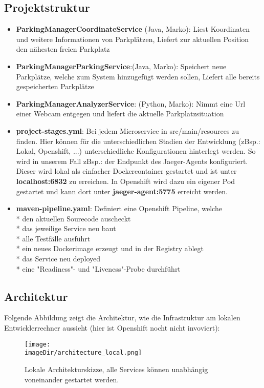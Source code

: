 \documentclass[11pt, a4paper, twoside]{article}   	%
\newcommand{\imageDir}{../../images}
\begin{document}
\subsection{Projektstruktur}
\begin{itemize}
	\item \textbf{ParkingManagerCoordinateService} (Java, Marko): Liest Koordinaten und weitere Informationen von Parkplätzen, Liefert zur aktuellen Position den nähesten freien Parkplatz
	\item \textbf{ParkingManagerParkingService}:(Java, Marko): Speichert neue Parkplätze, welche zum System hinzugefügt werden sollen, Liefert alle bereits gespeicherten Parkplätze
	\item \textbf{ParkingManagerAnalyzerService}: (Python, Marko): Nimmt eine Url einer Webcam entgegen und liefert die aktuelle Parkplatzsituation
	\item \textbf{project-stages.yml}: Bei jedem Microservice in src/main/resources zu finden. Hier können für die unterschiedlichen 
	Stadien der Entwicklung (zBsp.: Lokal, Openshift, ...) unterschiedliche Konfigurationen hinterlegt werden. So wird in unserem 
	Fall zBsp.: der Endpunkt des Jaeger-Agents konfiguriert. Dieser wird lokal als einfacher Dockercontainer gestartet und 
	ist unter \textbf{localhost:6832} zu erreichen. In Openshift wird dazu ein eigener Pod gestartet und kann dort unter \textbf{jaeger-agent:5775} erreicht werden.
	\item \textbf{maven-pipeline.yaml}: Definiert eine Openshift Pipeline, welche \\
	* den aktuellen Sourecode auscheckt\\
	* das jeweilige Service neu baut\\
	* alle Testfälle ausführt\\
	* ein neues Dockerimage erzeugt und in der Registry ablegt\\
	* das Service neu deployed\\
	* eine "Readiness"- und "Liveness"-Probe durchführt
\end{itemize}

\subsection{Architektur}
Folgende Abbildung zeigt die Architektur, wie die Infrastruktur am lokalen Entwicklerrechner aussieht (hier ist Openshift nocht nicht invoviert):
\begin{figure}[h]
	\centering
	\texttt{[image: \\imageDir/architecture\_local.png]}
	\caption{Lokale Architekturskizze, alle Services können unabhängig voneinander gestartet werden.}
\end{figure}
\end{document}

